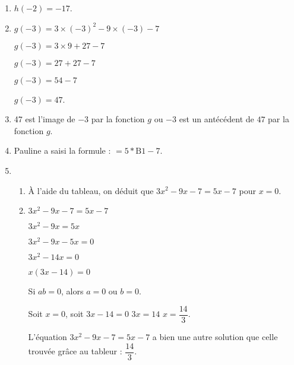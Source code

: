 \begin{enumerate}
\item %
$h(-2) = - 17$.
\item %
$g(-3) = 3 \times (-3)^2 - 9 \times(-3) - 7 $

$g(-3) = 3 \times 9 + 27 - 7$

$g(-3) = 27 + 27 - 7$

$g(-3) = 54 - 7$

$g(-3) = 47$.
\item %
47 est l’image de $- 3$ par la fonction $g$ ou $- 3$ est un antécédent de $47$ par la fonction $g$.
\item %
Pauline a saisi la formule :  $= 5 *\text{B}1 - 7$.
\item  
	\begin{enumerate}
		\item %

À l’aide du tableau, on déduit que
$3x^2 - 9x - 7 = 5x - 7$ pour $x = 0$.
		\item %


$3x^2 - 9x - 7 = 5x - 7$

$3x^2 - 9x = 5x$

$3x^2 - 9x - 5x = 0$

$3x^2 - 14x = 0$

$x(3x - 14) = 0$

Si $ab = 0$, alors $a = 0$ ou $b = 0$.

Soit $x = 0$, soit $3x - 14 = 0$
$3x =14$
$x = \dfrac{14}{3}$.

L’équation $3x^2 - 9x - 7 = 5x - 7$ a bien une autre solution que celle trouvée grâce au
tableur : $\dfrac{14}{3}$.
	\end{enumerate}
\end{enumerate}


\vspace{0,5cm}


